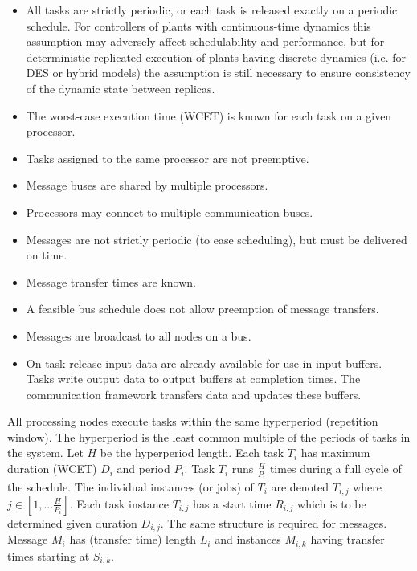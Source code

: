 \begin{itemize}
\item	All tasks are strictly periodic, or each task is released exactly on a periodic schedule.  For 
controllers of plants with continuous-time dynamics this assumption may adversely affect schedulability 
and performance\cite{control:scheduling2}, but for deterministic replicated execution of plants having 
discrete dynamics (i.e. for DES or hybrid models) the assumption is still necessary to ensure consistency 
of the dynamic state between replicas\cite{timed:tta}.
\item	The worst-case execution time (WCET) is known for each task on a given processor.
\item	Tasks assigned to the same processor are not preemptive.
\item	Message buses are shared by multiple processors.
\item Processors may connect to multiple communication buses.
\item	Messages are not strictly periodic (to ease scheduling), but must be delivered on time.
\item	Message transfer times are known.
\item	A feasible bus schedule does not allow preemption of message transfers.
\item Messages are broadcast to all nodes on a bus.
\item On task release input data are already available for use in input buffers. Tasks write output data to output buffers at completion times.  The communication framework transfers data and updates these buffers.
\end{itemize}

All processing nodes execute tasks within the same hyperperiod (repetition window\cite{sched:offline}).  
The hyperperiod is the least common multiple of the periods of tasks in the system.  Let $H$ be the 
hyperperiod length. Each task $T_i$ has maximum duration (WCET) $D_i$ and period $P_i$. Task $T_i$ 
runs $\frac{H}{{P_i}}$  times during a full cycle of the schedule.  The individual instances (or jobs) 
of $T_i$ are denoted $T_{i,j}$ where $j \in [1,...\frac{H}{{P_i }}]$.
Each task instance $T_{i,j}$ has a start time $R_{i,j}$ which is to be determined given 
duration $D_{i,j}$. The same structure is required for messages.  Message $M_i$ has (transfer time) 
length $L_i$ and instances $M_{i,k}$ having transfer times starting at $S_{i,k}$.

